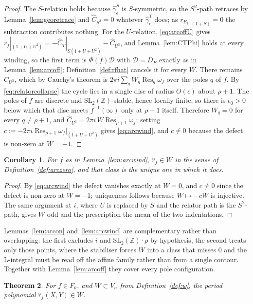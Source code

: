 \documentclass[11pt]{article}
\newtheorem{theorem}{Theorem}[section]
\newtheorem{corollary}[theorem]{Corollary}
\newcommand{\ZZ}{\mathbb{Z}}
\newcommand{\SLZ}{\mathrm{SL}_2(\ZZ)}
\DeclareMathOperator{\Res}{Res}
\begin{document}
\begin{proof}
The $S$-relation holds because $\hat\gamma^S_\epsilon$ is $S$-symmetric,
so the $S^2$-path retraces by Lemma~\ref{lem:georetrace} and $\hat C_{S^2}=0$ whatever
$\hat\gamma^T_\epsilon$ does; as $r_{E_k}|_{(1+S)}=0$ the subtraction contributes nothing. For the
$U$-relation, \eqref{eq:arcoffU} gives
$r_f|_{(1+U+U^2)}=-\hat C_T|_{S(1+U+U^2)}-\hat C_{U^3}$, and Lemma~\ref{lem:CTPhi} holds at every
winding, so the first term is $\Phi(f)\mathcal D$ with $\mathcal D=D_E$ exactly as in
Lemma~\ref{lem:arcoff}; Definition~\ref{def:rfhat} cancels it for every $W$. There remains
$\hat C_{U^3}$, which by Cauchy's theorem is $2\pi i\sum_qW_q\Res_q\omega_f$ over the poles $q$ of
$f$. By \eqref{eq:relatorcollapse} the cycle lies in a single disc of radius $O(\epsilon)$ about
$\rho+1$. The poles of $f$ are discrete and $\SLZ$-stable, hence locally finite, so there is
$\epsilon_0>0$ below which that disc meets $f^{-1}(\infty)$ only at $\rho+1$ itself. Therefore
$W_q=0$ for every $q\ne\rho+1$, and $\hat C_{U^3}=2\pi i\,W\Res_{\rho+1}\omega_f$; setting
$c:=-2\pi i\Res_{\rho+1}\omega_f\big|_{(1+U+U^2)}$ gives \eqref{eq:arcwind}, and $c\ne0$ because
the defect is non-zero at $W=-1$.
\end{proof}

\begin{corollary}\label{cor:arcell}
For $f$ as in Lemma~\ref{lem:arcwind}, $\hat r_f\in W$ in the sense of
Definition~\ref{def:arczero}, and that class is the unique one in which it does.
\end{corollary}

\begin{proof}
By \eqref{eq:arcwind} the defect vanishes exactly at $W=0$, and $c\ne0$ since the defect is
non-zero at $W=-1$; uniqueness follows because $W\mapsto-cW$ is injective. The same argument at
$i$, where $U$ is replaced by $S$ and the relator path is the $S^2$-path, gives $W$ odd and the
prescription the mean of the two indentations.
\end{proof}

Lemmas~\ref{lem:arcon} and~\ref{lem:arcwind} are complementary rather than overlapping: the first
excludes $i$ and $\SLZ\!\cdot\!\rho$ by hypothesis, the second treats only those points, where the
stabiliser forces $W$ into a class that misses $0$ and the L-integral must be read off the affine
family rather than from a single contour. Together with Lemma~\ref{lem:arcoff} they cover every
pole configuration.


\begin{theorem}\label{thm:arcperiod}
For $f\in F_k$, and $W\subset V_n$ from Definition~\ref{def:w}, the period polynomial
$\hat r_f(X,Y)\in W$.
\end{theorem}
\end{document}
